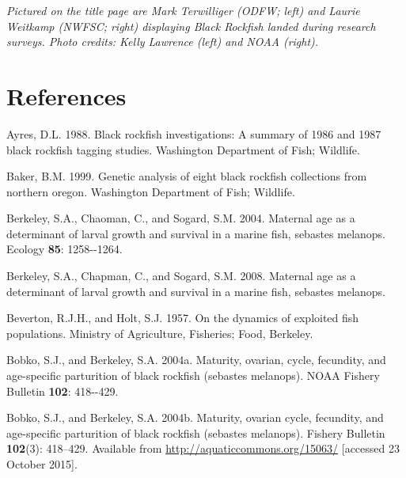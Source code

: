 \documentclass[11pt,
  english,
  letterpaper,
]{article}
\newlength{\cslhangindent}
\newenvironment{CSLReferences}[2] %
 {%
  \setlength{\parindent}{0pt}
  \ifodd #1 \everypar{\setlength{\hangindent}{\cslhangindent}}\ignorespaces\fi
  \ifnum #2 > 0
  \setlength{\parskip}{#2\baselineskip}
  \fi
 }%
 {}
\begin{document}
\textit{Pictured on the title page are Mark Terwilliger (ODFW; left) and Laurie Weitkamp (NWFSC; right) displaying Black Rockfish landed during research surveys. Photo credits: Kelly Lawrence (left) and NOAA (right).}

\clearpage

\hypertarget{references}{%
\section{References}\label{references}}

\hypertarget{refs}{}
\begin{CSLReferences}{1}{0}
\leavevmode{}%
Ayres, D.L. 1988. Black rockfish investigations: A summary of 1986 and 1987 black rockfish tagging studies. Washington Department of Fish; Wildlife.

\leavevmode{}%
Baker, B.M. 1999. Genetic analysis of eight black rockfish collections from northern oregon. Washington Department of Fish; Wildlife.

\leavevmode{}%
Berkeley, S.A., Chaoman, C., and Sogard, S.M. 2004. Maternal age as a determinant of larval growth and survival in a marine fish, sebastes melanops. Ecology \textbf{85}: 1258-\/-1264.

\leavevmode{}%
Berkeley, S.A., Chapman, C., and Sogard, S.M. 2008. Maternal age as a determinant of larval growth and survival in a marine fish, sebastes melanops.

\leavevmode{}%
Beverton, R.J.H., and Holt, S.J. 1957. On the dynamics of exploited fish populations. Ministry of Agriculture, Fisheries; Food, Berkeley.

\leavevmode{}%
Bobko, S.J., and Berkeley, S.A. 2004a. Maturity, ovarian, cycle, fecundity, and age-specific parturition of black rockfish (sebastes melanops). NOAA Fishery Bulletin \textbf{102}: 418-\/-429.

\leavevmode{}%
Bobko, S.J., and Berkeley, S.A. 2004b. Maturity, ovarian cycle, fecundity, and age-specific parturition of black rockfish (sebastes melanops). Fishery Bulletin \textbf{102}(3): 418--429. Available from \url{http://aquaticcommons.org/15063/} {[}accessed 23 October 2015{]}.


\end{CSLReferences}
\end{document}

